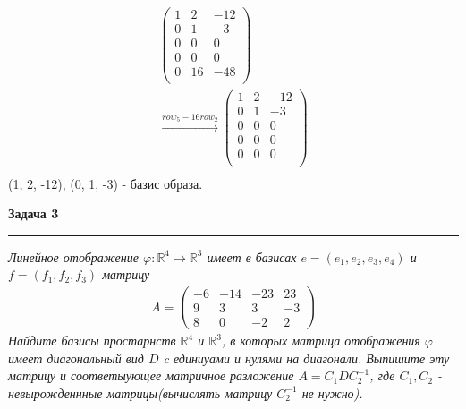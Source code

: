 \documentclass[a4paper,11pt]{article}
\begin{document}
\begin{gather*}
\begin{pmatrix}
1 & 2 & -12 \\
0 & 1 & -3 \\
0 & 0 & 0 \\
0 & 0 & 0 \\
0 & 16 & -48 \\
\end{pmatrix}
\\[3pt]
\stackrel{ row_{5} - 16row_{2} }{\longrightarrow}
\begin{pmatrix}
1 & 2 & -12 \\
0 & 1 & -3 \\
0 & 0 & 0 \\
0 & 0 & 0 \\
0 & 0 & 0 \\
\end{pmatrix}
\\[3pt]
\end{gather*}
(1, 2, -12), (0, 1, -3) - базис образа.
\newpage









\textbf{\large Задача 3}
\medskip\hrule\medskip
\textit{Линейное отображение $ \varphi: \mathbb{R}^4 \rightarrow \mathbb{R}^3 $ имеет в базисах $ e = (e_1, e_2, e_3, e_4) $ и $ f = (f_1, f_2, f_3) $ матрицу} 
\begin{align*}
A = 
\begin{pmatrix}
-6 & -14 & -23 & 23 \\[2pt]
9 & 3 & 3 & -3 \\[2pt]
8 & 0 & -2 & 2
\end{pmatrix}
\end{align*}
\textit{Найдите базисы простарнств $ \mathbb{R}^4 $ и $ \mathbb{R}^3 $, в которых матрица отображения $ \varphi $  имеет диагональный вид $ D $ c единиуами и нулями на диагонали. Выпишите эту матрицу и соответыующее матричное разложение $ A = C_1DC_2^{-1} $, где $ C_1, C_2 $ - невырожденнные матрицы(вычислять матрицу $ C_2^{-1} $ не нужно).} \\ \\ 
\end{document}
